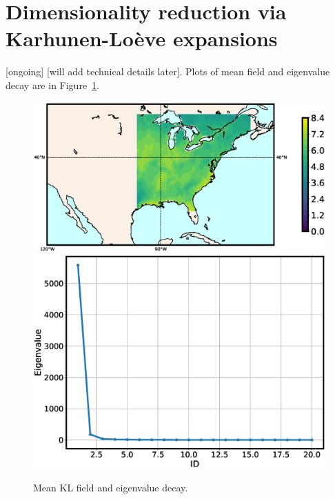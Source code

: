 \documentclass[12pt]{article}
\begin{document}
\section{Dimensionality reduction via Karhunen-Lo{\`e}ve expansions}
 [ongoing] [will add technical details later]. Plots of mean field and eigenvalue decay are in Figure~\ref{fig:kl}.


\begin{figure}[!hb]
\includegraphics[height=0.33\textwidth]{figs/map_mean_kl.eps}\hfill
\includegraphics[height=0.33\textwidth]{figs/eig.eps}
\caption{\label{fig:kl} Mean KL field and eigenvalue decay.}
\end{figure}



\end{document}
